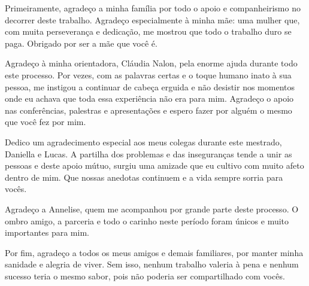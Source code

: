 Primeiramente, agradeço a minha família por todo o apoio e companheirismo no decorrer deste trabalho. Agradeço especialmente à minha mãe: uma mulher que, com muita perseverança e dedicação, me mostrou que todo o trabalho duro se paga. Obrigado por ser a mãe que você é.

Agradeço à minha orientadora, Cláudia Nalon, pela enorme ajuda durante todo este processo. Por vezes, com as palavras certas e o toque humano inato à sua pessoa, me instigou a continuar de cabeça erguida e não desistir nos momentos onde eu achava que toda essa experiência não era para mim. Agradeço o apoio nas conferências, palestras e apresentações e espero fazer por alguém o mesmo que você fez por mim.

Dedico um agradecimento especial aos meus colegas durante este mestrado, Daniella e Lucas. A partilha dos problemas e das inseguranças tende a unir as pessoas e deste apoio mútuo, surgiu uma amizade que eu cultivo com muito afeto dentro de mim. Que nossas anedotas continuem e a vida sempre sorria para vocês.

Agradeço a Annelise, quem me acompanhou por grande parte deste processo. O ombro amigo, a parceria e todo o carinho neste período foram únicos e muito importantes para mim.

Por fim, agradeço a todos os meus amigos e demais familiares, por manter minha sanidade e alegria de viver. Sem isso, nenhum trabalho valeria à pena e nenhum sucesso teria o mesmo sabor, pois não poderia ser compartilhado com vocês.